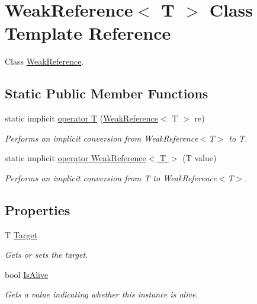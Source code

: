 \hypertarget{class_weak_reference}{}\section{Weak\+Reference$<$ T $>$ Class Template Reference}
\label{class_weak_reference}


Class \hyperlink{class_weak_reference}{Weak\+Reference}.  


\subsection*{Static Public Member Functions}
\begin{DoxyCompactItemize}
\item 
static implicit \hyperlink{class_weak_reference_ac37493187825d4bc977bae1cb9539b29}{operator T} (\hyperlink{class_weak_reference}{Weak\+Reference}$<$ T $>$ re)
\begin{DoxyCompactList}\small\item\em Performs an implicit conversion from Weak\+Reference$<$\+T$>$ to T. \end{DoxyCompactList}\item 
static implicit \hyperlink{class_weak_reference_a22177097045b9c8b423927e211bfa7c3}{operator Weak\+Reference$<$ T $>$} (T value)
\begin{DoxyCompactList}\small\item\em Performs an implicit conversion from T to Weak\+Reference$<$\+T$>$. \end{DoxyCompactList}\end{DoxyCompactItemize}
\subsection*{Properties}
\begin{DoxyCompactItemize}
\item 
T \hyperlink{class_weak_reference_a2a0d5016c3ce0d81bc10fff68f7a0d7d}{Target}
\begin{DoxyCompactList}\small\item\em Gets or sets the target. \end{DoxyCompactList}\item 
bool \hyperlink{class_weak_reference_a8e3c6f9ec8a6c6920900949950515e63}{Is\+Alive}
\begin{DoxyCompactList}\small\item\em Gets a value indicating whether this instance is alive. \end{DoxyCompactList}\end{DoxyCompactItemize}


